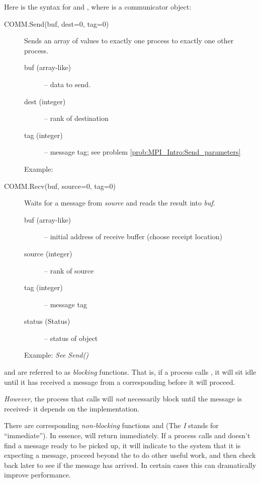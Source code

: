Here is the syntax for  and , where  is a
communicator object:

\begin{description}
\item[COMM.Send(buf, dest=0, tag=0)]
Sends an array of values to exactly one process to exactly one other process.
\begin{description}
\item[buf (array-like)] – data to send.


\item[dest (integer)] – rank of destination
\item[tag (integer)] – message tag; see problem \ref{prob:MPI_Intro:Send_parameters} %
\end{description}
Example:



\item[COMM.Recv(buf, source=0, tag=0)]
Waits for a message from \emph{source} and reads the result into \emph{buf}.
\begin{description}
\item[buf (array-like)] – initial address of receive buffer (choose receipt location)
\item[source (integer)] – rank of source
\item[tag (integer)] – message tag
\item[status (Status)] – status of object
\end{description}
Example:
\emph{See Send()}
\end{description}

\begin{info}
 and  are referred to as \emph{blocking} functions. That is,
if a process calls , it will sit idle until it has received a message
from a corresponding  before it will proceed.

\emph{However}, the process that calls  will \emph{not}
necessarily block until the message is received- it depends on the
implementation.

There are corresponding \emph{non-blocking} functions  and 
(The \emph{I} stands for ``immediate''). In essence,  will return
immediately. If a process calls  and doesn't find a message ready to
be picked up, it will indicate to the system that it is expecting a message,
proceed beyond the  to do other useful work, and then check back later
to see if the message has arrived. In certain cases this can dramatically
improve performance.
\end{info}


